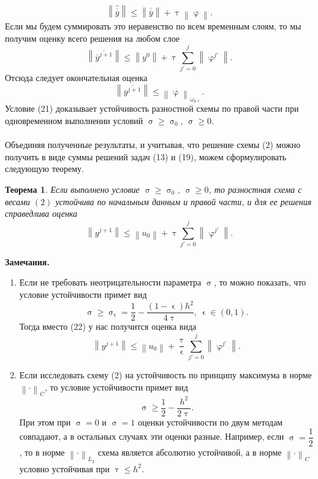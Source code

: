 \documentclass[a4paper, 12pt]{report}
\numberwithin{equation}{section}
\newcommand{\ol}{\overline}
\renewcommand{\leq}{\leqslant}
\renewcommand{\geq}{\geqslant}
\renewcommand{\varphi}{\upvarphi}
\renewcommand{\phi}{\upvarphi}
\renewcommand{\tau}{\uptau}
\renewcommand{\sigma}{\upsigma}
\renewcommand{\omega}{\upomega}
\renewcommand{\epsilon}{\upvarepsilon}
\newcommand\Norm[1]{\left\| #1 \right\|}
\newtheorem*{theorem}{Теорема}
\begin{document}
		$$\Norm {\hat{\ol{\ol y}}}\leq\Norm{\ol{\ol y}} + \tau \Norm{\varphi}.$$
		Если мы будем суммировать это неравенство по всем временным слоям, то мы получим оценку всего решения на любом слое 
		$$\Norm{\ol{\ol {y}^{j+1}}} \leq \Norm{y^0} + \tau \sum_{j'= 0}^j \Norm{\phi^{j'}}.$$
		Отсюда следует окончательная оценка
		\begin{equation}
			\Norm{\ol{\ol {y}^{j+1}}}\leq \Norm{\phi}_{\omega _{h\tau}}.
		\end{equation}
		Условие (21) доказывает устойчивость разностной схемы по правой части при одновременном выполнении условий $\sigma \geq \sigma_0$, $\sigma \geq 0$. \\\\
		Объединяя полученные результаты, и учитывая, что решение схемы (2) можно получить в виде суммы решений задач (13) и (19), можем сформулировать следующую теорему.
		\begin{theorem}
			Если выполнено условие $\sigma \geq \sigma_0$, $\sigma \geq 0$, то разностная схема с весами $(2)$ устойчива по начальным данным и правой части, и для ее решения справедлива оценка
			\begin{equation}
				\Norm{y^{j+1}}\leq \Norm{u_0} + \tau \sum_{j'=0}^j \Norm{\phi^{j'}}.
			\end{equation}
		\end{theorem}
		\textbf{Замечания.} \begin{enumerate}
			\item Если не требовать неотрицательности параметра $\sigma$, то можно показать, что условие устойчивости примет вид
		\begin{equation}
			\sigma \geq \sigma _\epsilon = \dfrac 12 - \dfrac{(1-\epsilon) h^2}{4\tau},\ \epsilon \in (0,1).
		\end{equation}
		Тогда вместо (22) у нас получится оценка вида
		\begin{equation}
			\Norm{y^{j+1}} \leq \Norm{u_0} + \dfrac \tau \epsilon \sum_{j'=0}^j \Norm{\phi^{j'}}.
		\end{equation}
		\item Если исследовать схему (2) на устойчивость по принципу максимума в норме $\Norm{\cdot}_C$, то условие устойчивости примет вид \begin{equation}
			\sigma \geq \dfrac 12 - \dfrac{h^2}{2\tau}.
		\end{equation}
		При этом при $\sigma = 0$ и $\sigma = 1$ оценки устойчивости по двум методам совпадают, а в остальных случаях эти оценки разные. Например, если $\sigma = \dfrac 12$, то в норме $\Norm{\cdot }_{L_2}$ схема является абсолютно устойчивой, а в норме $\Norm{\cdot }_C$ условно устойчивая при $\tau \leq h^2$.
		\end{enumerate}
\end{document}
